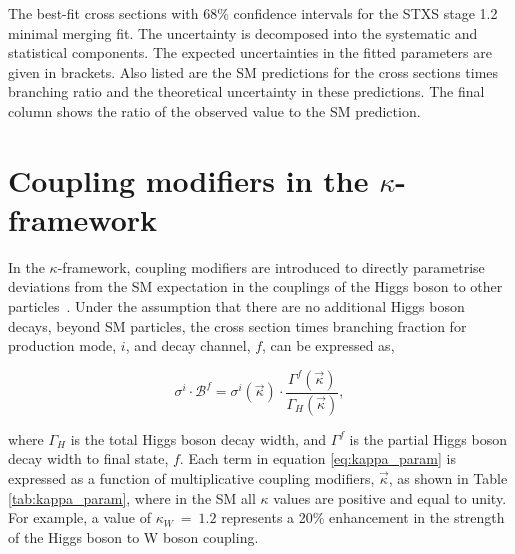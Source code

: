 \begin{table}[htbp]
  \centering
  \scriptsize
  \renewcommand{\arraystretch}{1.8}
  \setlength{\tabcolsep}{2.2pt}
  \caption[Results of the STXS stage 1.2 minimal merging fit]
  {
    The best-fit cross sections with 68\% confidence intervals for the STXS stage 1.2 minimal merging fit. The uncertainty is decomposed into the systematic and statistical components. The expected uncertainties in the fitted parameters are given in brackets. Also listed are the SM predictions for the cross sections times branching ratio and the theoretical uncertainty in these predictions. The final column shows the ratio of the observed value to the SM prediction.
  }
  \label{tab:stage1p2_minimal_results}
  \hspace*{-1cm}
  
  \hspace*{-1cm}
\end{table}

\newpage
\section{Coupling modifiers in the $\kappa$-framework}\label{sec:results_kappa}
In the $\kappa$-framework, coupling modifiers are introduced to directly parametrise deviations from the SM expectation in the couplings of the Higgs boson to other particles~\cite{Heinemeyer:2013tqa}. Under the assumption that there are no additional Higgs boson decays, beyond SM particles, the cross section times branching fraction for production mode, $i$, and decay channel, $f$, can be expressed as,

\begin{equation}\label{eq:kappa_param}
    \sigma^i \cdot \mathcal{B}^f = \sigma^i(\vec{\kappa}) \cdot \frac{\Gamma^f(\vec{\kappa})}{\Gamma_H(\vec{\kappa})},
\end{equation}

\noindent
where $\Gamma_H$ is the total Higgs boson decay width, and $\Gamma^f$ is the partial Higgs boson decay width to final state, $f$. Each term in equation \ref{eq:kappa_param} is expressed as a function of multiplicative coupling modifiers, $\vec{\kappa}$, as shown in Table \ref{tab:kappa_param}, where in the SM all $\kappa$ values are positive and equal to unity. For example, a value of $\kappa_W~=~1.2$ represents a 20\% enhancement in the strength of the Higgs boson to W boson coupling.

